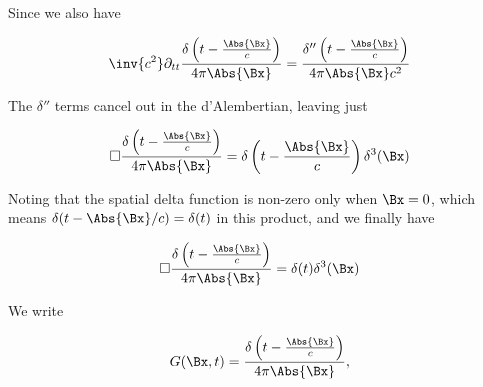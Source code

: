 Since we also have

\begin{equation}\label{eqn:relativisticElectrodynamicsL18:500}
\inv{c^2} \partial_{tt}
\frac{\delta\left(t - \frac{\Abs{\Bx}}{c}\right)}{4 \pi \Abs{\Bx} }
=
\frac{\delta''\left(t - \frac{\Abs{\Bx}}{c}\right)}{4 \pi \Abs{\Bx} c^2}
\end{equation}

The \(\delta''\) terms cancel out in the d'Alembertian, leaving just

\begin{equation}\label{eqn:relativisticElectrodynamicsL18:460}
\square \frac{\delta\left(t - \frac{\Abs{\Bx}}{c}\right)}{4 \pi \Abs{\Bx} }
=
\delta\left(t - \frac{\Abs{\Bx}}{c}\right) \delta^3(\Bx) 
\end{equation}

Noting that the spatial delta function is non-zero only when \(\Bx = 0\), which means \(\delta(t - \Abs{\Bx}/c) = \delta(t)\) in this product, and we finally have

\begin{equation}\label{eqn:relativisticElectrodynamicsL18:480}
\square \frac{\delta\left(t - \frac{\Abs{\Bx}}{c}\right)}{4 \pi \Abs{\Bx} }
=
\delta(t) \delta^3(\Bx) 
\end{equation}

We write

\begin{equation}\label{eqn:relativisticElectrodynamicsL18:520}
G(\Bx, t) = \frac{\delta\left(t - \frac{\Abs{\Bx}}{c}\right)}{4 \pi \Abs{\Bx} },
\end{equation}
